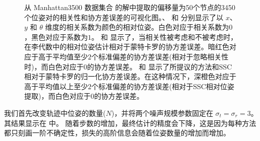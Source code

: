 \begin{figure}[!t]
{    }
    \hfill
    \caption{从 Manhattan3500 数据集合 \cite{olson2006fast} 的解中提取的偏移量为50个节点的3450个位姿对的相关性和协方差误差的可视化图。\protect{}、\protect{} 和 \protect{} 分别显示了以 $x$、$y$ 和 $\theta$ 维度的相关系数为颜色的相对位姿。白色对应于相关系数为$0$，黑色对应于系数为$1$。\protect{} 和 \protect{} 显示了，当相关性被考虑和不被考虑时，在李代数中的相对位姿估计相对于蒙特卡罗的协方差误差。暗红色对应于高于平均值至少$2$个标准偏差的协方差误差(相对于忽略相关性时)，而白色对应于$0$的协方差误差。\protect{} 和 \protect{} 显示了所提议的方法和SSC \cite{smith1990a} 相对于蒙特卡罗的归一化协方差误差。在这种情况下，深橙色对应于高于平均值以上至少$2$个标准偏差的协方差误差(相对于SSC相对位姿提取)，而白色对应于$0$的协方差误差。}
    \label{fig:slam_rp_error_50}
\end{figure}




我们首先改变轨迹中位姿的数量($N$)，并将两个噪声规模参数固定在 $\sigma_t = \sigma_r = 3$。 
其结果显示在  中。 
随着步数的增加，最终估计的精度会下降，这是因为每种方法都只刻画一阶不确定性，损失的高阶信息会随着位姿数量的增加而增加。 

\begin{table}[t!]
  \addtolength{\tabcolsep}{-5pt}
  \centering
  \caption{从 Manhattan3500 数据集合 \cite{olson2006fast} 的解中提取的总共44425个位姿对，其中位姿偏移范围为5到500个节点，在考虑和忽略相关性时，所提议的李代数相对位姿估计的协方差误差统计摘要。}
  \label{table:cov_error}
\end{table}


